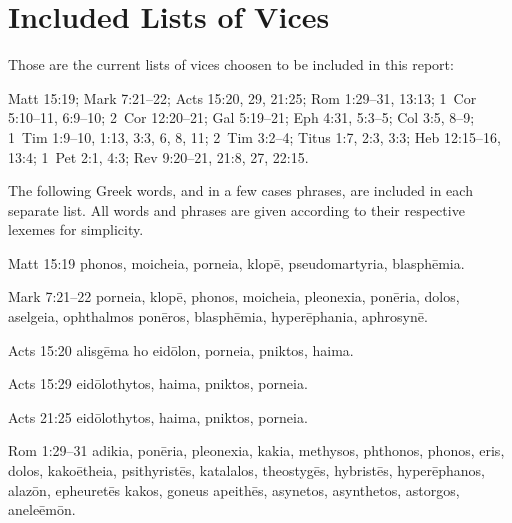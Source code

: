 \section{Included Lists of Vices}
Those are the current lists of vices choosen to be included in this report:

Matt 15:19; Mark 7:21--22; Acts 15:20, 29, 21:25; Rom 1:29--31, 13:13; 1~Cor 5:10--11, 6:9--10; 2~Cor 12:20--21; Gal 5:19--21; Eph 4:31, 5:3--5; Col 3:5, 8--9; 1~Tim 1:9--10, 1:13, 3:3, 6, 8, 11; 2~Tim 3:2--4; Titus 1:7, 2:3, 3:3; Heb 12:15--16, 13:4; 1~Pet 2:1, 4:3; Rev 9:20--21, 21:8, 27, 22:15.

The following Greek words, and in a few cases phrases, are included in each separate list. All words and phrases are given according to their respective lexemes for simplicity.

Matt 15:19 \gls{phonos}, \gls{moicheia}, \gls{porneia}, \gls{klopē}, \gls{pseudomartyria}, \gls{blasphēmia}.

Mark 7:21--22 \gls{porneia}, \gls{klopē}, \gls{phonos}, %
 \gls{moicheia}, \gls{pleonexia}, \gls{ponēria}, \gls{dolos}, \gls{aselgeia}, \gls{ophthalmos ponēros}, \gls{blasphēmia}, \gls{hyperēphania}, \gls{aphrosynē}. %

Acts 15:20 \gls{alisgēma ho eidōlon}, \gls{porneia}, \gls{pniktos}, \gls{haima}.

Acts 15:29 \gls{eidōlothytos}, \gls{haima}, \gls{pniktos}, \gls{porneia}.

Acts 21:25 \gls{eidōlothytos}, \gls{haima}, \gls{pniktos}, \gls{porneia}.

Rom 1:29--31 \gls{adikia}, \gls{ponēria}, \gls{pleonexia}, \gls{kakia}, \gls{methysos}, \gls{phthonos}, \gls{phonos}, \gls{eris}, \gls{dolos}, \gls{kakoētheia}, \gls{psithyristēs}, %
\gls{katalalos}, \gls{theostygēs}, \gls{hybristēs}, \gls{hyperēphanos}, \gls{alazōn}, \gls{epheuretēs kakos}, \gls{goneus apeithēs}, %
\gls{asynetos}, \gls{asynthetos}, \gls{astorgos}, \gls{aneleēmōn}. %

